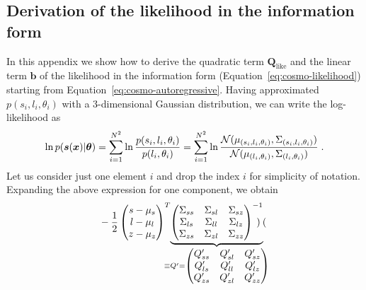 
\begin{subappendices}

\section{Derivation of the likelihood in the information form} \label{apx:info}

In this appendix we show how to derive the quadratic term $\bm Q_\text{like}$ and the linear term $\bm b$ of the likelihood in the information form (Equation~\ref{eq:cosmo-likelihood}) starting from Equation~\ref{eq:cosmo-autoregressive}. Having approximated $p(s_i, l_i, \theta_i)$ with a 3-dimensional Gaussian distribution, we can write the log-likelihood as
%
\begin{equation}
    \ln p(\bm s(\bm{x})| \bm{\theta}) = \sum_{i=1}^{N^2} \ln \frac{p(s_i, l_i, \theta_i)}{p(l_i, \theta_i)} = \sum_{i=1}^{N^2} \ln \frac{\mathcal{N}(\mu_{(s_i, l_i, \theta_i)}, \Sigma_{(s_i, l_i, \theta_i)})}{\mathcal{N}(\mu_{(l_i, \theta_i)}, \Sigma_{(l_i, \theta_i)})} \;.
\end{equation}
%
Let us consider just one element $i$ and drop the index $i$ for simplicity of notation. Expanding the above expression for one component, we obtain
%
\begin{equation}\label{eq:cosmo-matrix}
\begin{split}
    & -\frac12
    \begin{pmatrix}
    s-\mu_s \\
    l-\mu_l \\ 
    z-\mu_z \\
    \end{pmatrix}^T\hspace{-3mm}
    \underbrace{
    \begin{pmatrix}
    \Sigma_{ss} & \Sigma_{sl} & \Sigma_{sz} \\
    \Sigma_{ls} & \Sigma_{ll} & \Sigma_{lz} \\
    \Sigma_{zs} & \Sigma_{zl} & \Sigma_{zz}
    \end{pmatrix}^{-1}}_{
    \equiv Q' = 
    \begin{pmatrix}
    Q'_{ss} & Q'_{sl} & Q'_{sz} \\
    Q'_{ls} & Q'_{ll} & Q'_{lz} \\
    Q'_{zs} & Q'_{zl} & Q'_{zz}
    \end{pmatrix}
    }\hspace{-3mm}
    \begin{pmatrix}

\end{pmatrix}
\end{split}
\end{equation}
\end{subappendices}
